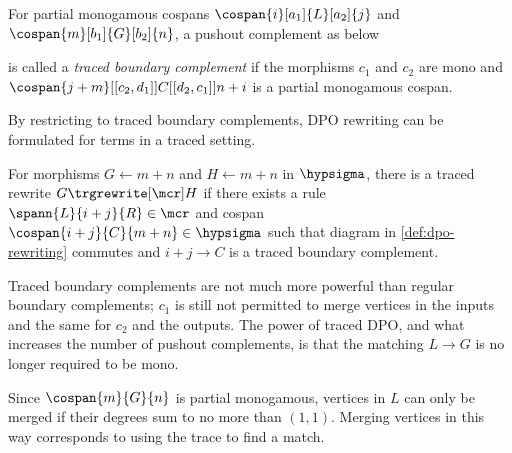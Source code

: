 \begin{definition}
    \label{def:traced-boundary-complement}
    For partial monogamous cospans \(
    \cospan{i}[a_1]{L}[a_2]{j}
    \) and \(
    \cospan{m}[b_1]{G}[b_2]{n}
    \), a pushout complement as below
    \begin{center}
    \end{center}
    is called a \emph{traced boundary complement} if the morphisms \(c_1\) and
    \(c_2\) are mono and \(
    \cospan{j + m}[[c_2,d_1]]{C}[[d_2,c_1]]{n + i}
    \) is a partial monogamous cospan.
\end{definition}

By restricting to traced boundary complements, DPO rewriting can be formulated
for terms in a traced setting.

\begin{definition}
    For morphisms \(G \leftarrow m + n\) and \(H \leftarrow m + n\) in
    \(\hypsigma\), there is a traced rewrite \(G \trgrewrite[\mcr] H\) if there
    exists a rule \(
    \spann{L}{i + j}{R} \in \mcr
    \) and cospan \(
    \cospan{i + j}{C}{m + n} \in \hypsigma
    \) such that diagram in \cref{def:dpo-rewriting} commutes and \(i + j \to C\)
    is a traced boundary complement.
\end{definition}

Traced boundary complements are not much more powerful than regular boundary
complements; \(c_1\) is still not permitted to merge vertices in the inputs and
the same for \(c_2\) and the outputs.
The power of traced DPO, and what increases the number of pushout
complements, is that the matching \(L \to G\) is no longer required to be mono.

Since \(\cospan{m}{G}{n}\) is partial monogamous, vertices
in \(L\) can only be merged if their degrees sum to no more than \((1,1)\).
Merging vertices in this way corresponds to using the trace to find a match.

